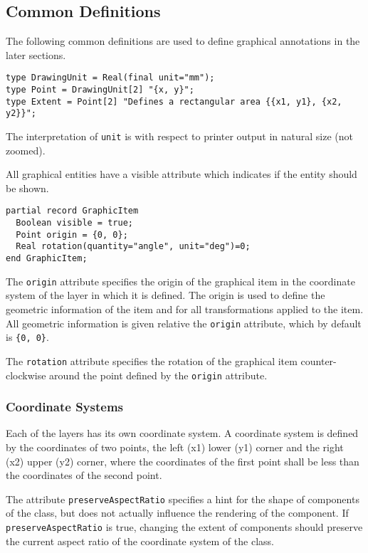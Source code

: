 \subsection{Common Definitions}\label{common-definitions}

The following common definitions are used to define graphical annotations in the later sections.
\begin{lstlisting}[language=modelica]
type DrawingUnit = Real(final unit="mm");
type Point = DrawingUnit[2] "{x, y}";
type Extent = Point[2] "Defines a rectangular area {{x1, y1}, {x2, y2}}";
\end{lstlisting}%
The interpretation of \lstinline!unit! is with respect to printer output in natural size (not zoomed).

All graphical entities have a visible attribute which indicates if the entity should be shown.
\begin{lstlisting}[language=modelica]
partial record GraphicItem
  Boolean visible = true;
  Point origin = {0, 0};
  Real rotation(quantity="angle", unit="deg")=0;
end GraphicItem;
\end{lstlisting}%
The \lstinline!origin! attribute specifies the origin of the graphical item in the coordinate system of the layer in which it is defined.
The origin is used to define the geometric information of the item and for all transformations applied to the item.
All geometric information is given relative the \lstinline!origin! attribute, which by default is \lstinline!{0, 0}!.

The \lstinline!rotation! attribute specifies the rotation of the graphical item counter-clockwise around the point defined by the \lstinline!origin! attribute.

\subsubsection{Coordinate Systems}\label{coordinate-systems}

Each of the layers has its own coordinate system.
A coordinate system is defined by the coordinates of two points, the left (x1) lower (y1) corner and the right (x2) upper (y2) corner, where the coordinates of the first point shall be less than the coordinates of the second point.

The attribute \lstinline!preserveAspectRatio! specifies a hint for the shape of components of the class, but does not actually influence the rendering of the component.
If \lstinline!preserveAspectRatio! is true, changing the extent of components should preserve the current aspect ratio of the coordinate system of the class.


